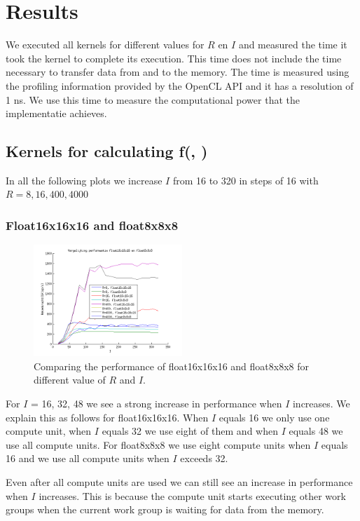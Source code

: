 \documentclass[11pt]{IEEEtran}
\begin{document}
\section{Results}
We executed all kernels for different values for $R$ en $I$ and measured the time it took the kernel to complete its execution. This time does not include the time necessary to transfer data from and to the memory. The time is measured using the profiling information provided by the OpenCL API and it has a resolution of 1 ns. \cite[p.~4-13]{amd} We use this time to measure the computational power that the implementatie achieves. \cite[p.~4-13]{amd}

\subsection{Kernels for calculating f(\TT, \UUU)}
In all the following plots we increase $I$ from 16 to 320 in steps of 16 with $R=8, 16, 400, 4000$

\subsubsection{Float16x16x16 and float8x8x8}
\begin{figure}[h]
\centering
\includegraphics[width=0.5\textwidth]{fl16_vs_fl8_groot}
\caption{\label{fl16_vs_fl8} Comparing the performance of float16x16x16 and float8x8x8 for different value of $R$ and $I$.}
\end{figure}

For $I$ = 16, 32, 48 we see a strong increase in performance when $I$ increases. We explain this as follows for float16x16x16. When $I$ equals 16 we only use one compute unit, when $I$ equals 32 we use eight of them and when $I$ equals 48 we use all compute units. For float8x8x8 we use eight compute units when $I$ equals 16 and we use all compute units when $I$ exceeds 32.

Even after all compute units are used we can still see an increase in performance when $I$ increases. This is because the compute unit starts executing other work groups when the current work group is waiting for data from the memory.
\end{document}
